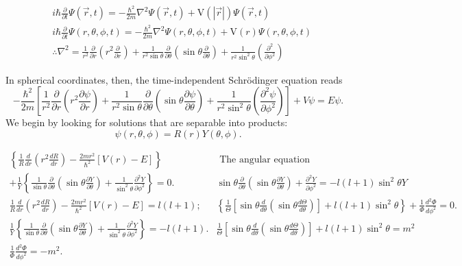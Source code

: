 \documentclass{article}
\begin{document}
$$
\begin{aligned}
&i \hbar \frac{\partial}{\partial t} \Psi(\vec{r}, t)=-\frac{\hbar^{2}}{2 m} \nabla^{2} \Psi(\vec{r}, t)+\mathrm{V}(|\vec{r}|) \Psi(\vec{r}, t) \\
&i \hbar \frac{\partial}{\partial t} \Psi(r, \theta, \phi, t)=-\frac{\hbar^{2}}{2 m} \nabla^{2} \Psi(r, \theta, \phi, t)+\mathrm{V}(r) \Psi(r, \theta, \phi, t) \\
&\therefore \nabla^{2}=\frac{1}{r^{2}} \frac{\partial}{\partial r}\left(r^{2} \frac{\partial}{\partial r}\right)+\frac{1}{r^{2} \sin \theta} \frac{\partial}{\partial \theta}\left(\sin \theta \frac{\partial}{\partial \theta}\right)+\frac{1}{r^{2} \sin ^{2} \theta}\left(\frac{\partial^{2}}{\partial \phi^{2}}\right)
\end{aligned}
$$


In spherical coordinates, then, the time-independent Schrödinger equation reads
$$
-\frac{\hbar^{2}}{2 m}\left[\frac{1}{r^{2}} \frac{\partial}{\partial r}\left(r^{2} \frac{\partial \psi}{\partial r}\right)+\frac{1}{r^{2} \sin \theta} \frac{\partial}{\partial \theta}\left(\sin \theta \frac{\partial \psi}{\partial \theta}\right)+\frac{1}{r^{2} \sin ^{2} \theta}\left(\frac{\partial^{2} \psi}{\partial \phi^{2}}\right)\right] +V \psi=E \psi .
$$
We begin by looking for solutions that are separable into products:
$$
\psi(r, \theta, \phi)=R(r) Y(\theta, \phi) .
$$

$$
\begin{array}{cc}
\left\{\frac{1}{R} \frac{d}{d r}\left(r^{2} \frac{d R}{d r}\right)-\frac{2 m r^{2}}{\hbar^{2}}[V(r)-E]\right\} & \text { The angular equation } \\
+\frac{1}{Y}\left\{\frac{1}{\sin \theta} \frac{\partial}{\partial \theta}\left(\sin \theta \frac{\partial Y}{\partial \theta}\right)+\frac{1}{\sin ^{2} \theta} \frac{\partial^{2} Y}{\partial \phi^{2}}\right\}=0 . & \sin \theta \frac{\partial}{\partial \theta}\left(\sin \theta \frac{\partial Y}{\partial \theta}\right)+\frac{\partial^{2} Y}{\partial \phi^{2}}=-l(l+1) \sin ^{2} \theta Y \\
\frac{1}{R} \frac{d}{d r}\left(r^{2} \frac{d R}{d r}\right)-\frac{2 m r^{2}}{\hbar^{2}}[V(r)-E]=l(l+1) ; & \left\{\frac{1}{\Theta}\left[\sin \theta \frac{d}{d \theta}\left(\sin \theta \frac{d \Theta}{d \theta}\right)\right]+l(l+1) \sin ^{2} \theta\right\}+\frac{1}{\Phi} \frac{d^{2} \Phi}{d \phi^{2}}=0 . \\
\frac{1}{Y}\left\{\frac{1}{\sin \theta} \frac{\partial}{\partial \theta}\left(\sin \theta \frac{\partial Y}{\partial \theta}\right)+\frac{1}{\sin ^{2} \theta} \frac{\partial^{2} Y}{\partial \phi^{2}}\right\}=-l(l+1) . & \frac{1}{\Theta}\left[\sin \theta \frac{d}{d \theta}\left(\sin \theta \frac{d \Theta}{d \theta}\right)\right]+l(l+1) \sin ^{2} \theta=m^{2} \\
\frac{1}{\Phi} \frac{d^{2} \Phi}{d \phi^{2}}=-m^{2} .
\end{array}
$$
\end{document}
